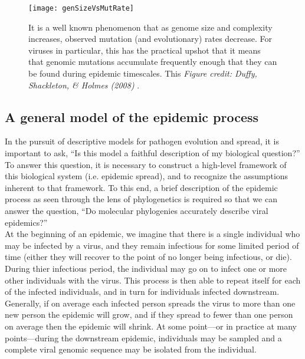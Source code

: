 \begin{figure}[ht]
  \centering
  \texttt{[image: genSizeVsMutRate]}
  \caption[Genome size vs. mutation rate in viruses.]{It is a well known phenomenon that as genome size and complexity increases, observed mutation (and evolutionary) rates decrease. For viruses in particular, this has the practical upshot that it means that genomic mutations accumulate frequently enough that they can be found during epidemic timescales. This  \textit{Figure credit: Duffy, Shackleton, \& Holmes (2008)} \citep{duffy2008rates}.}
  \label{fig:sizeVsRates}
\end{figure}


\subsection{A general model of the epidemic process}
In the pursuit of descriptive models for pathogen evolution and spread, it is important to ask, ``Is this model a faithful description of my biological question?''
To answer this question, it is necessary to construct a high-level framework of this biological system (i.e. epidemic spread), and to recognize the assumptions inherent to that framework.
To this end, a brief description of the epidemic process as seen through the lens of phylogenetics is required so that we can answer the question, ``Do molecular phylogenies accurately describe viral epidemics?''\\

At the beginning of an epidemic, we imagine that there is a single individual who may be infected by a virus, and they remain infectious for some limited period of time (either they will recover to the point of no longer being infectious, or die).
During thier infectious period, the individual may go on to infect one or more other individuals with the virus.
This process is then able to repeat itself for each of the infected individuals, and in turn for individuals infected downstream.
Generally, if on average each infected person spreads the virus to more than one new person the epidemic will grow, and if they spread to fewer than one person on average then the epidemic will shrink.
At some point---or in practice at many points---during the downstream epidemic, individuals may be sampled and a complete viral genomic sequence may be isolated from the individual.


